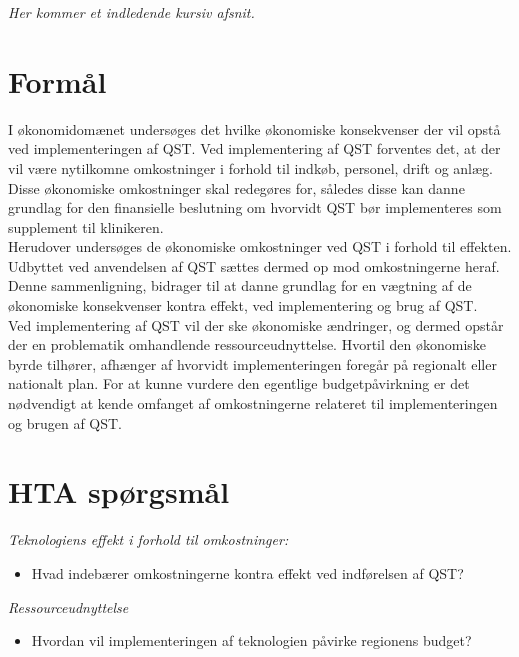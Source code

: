 \textit{Her kommer et indledende kursiv afsnit.}
\section{Formål}
I økonomidomænet undersøges det hvilke økonomiske konsekvenser der vil opstå ved implementeringen af QST. Ved implementering af QST forventes det, at der vil være nytilkomne omkostninger i forhold til indkøb, personel, drift og anlæg. Disse økonomiske omkostninger skal redegøres for, således disse kan danne grundlag for den finansielle beslutning om hvorvidt QST bør implementeres som supplement til klinikeren. \\
Herudover undersøges de økonomiske omkostninger ved QST i forhold til effekten. Udbyttet ved anvendelsen af QST sættes dermed op mod omkostningerne heraf. Denne sammenligning, bidrager til at danne grundlag for en vægtning af de økonomiske konsekvenser kontra effekt, ved implementering og brug af QST. \\ 
Ved implementering af  QST vil der ske økonomiske ændringer, og dermed opstår der en problematik omhandlende ressourceudnyttelse. Hvortil den økonomiske byrde tilhører, afhænger af hvorvidt implementeringen foregår på regionalt eller nationalt plan. For at kunne vurdere den egentlige budgetpåvirkning er det nødvendigt at kende omfanget af  omkostningerne relateret til implementeringen og brugen af QST. 
\section{HTA spørgsmål}
\textit{Teknologiens effekt i forhold til omkostninger:}
\begin{itemize}
	\item Hvad indebærer omkostningerne kontra effekt ved indførelsen af QST? %
\end{itemize}

\textit{Ressourceudnyttelse}
\begin{itemize}
	\item Hvordan vil implementeringen af teknologien påvirke regionens budget?%
\end{itemize}
